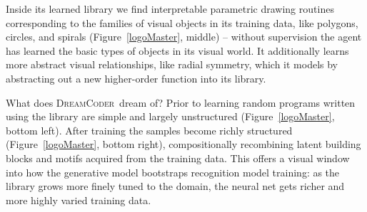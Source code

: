 \documentclass{article}
\newcommand{\system}{\textsc{DreamCoder}~}
\begin{document}
Inside its learned library we find interpretable parametric drawing
routines corresponding to the families of visual objects in its
training data, like polygons, circles, and spirals
(Figure~\ref{logoMaster}, middle) -- without supervision the agent
has learned the basic types of objects in its visual world. It
additionally learns more abstract visual relationships, like
radial symmetry, which it models by abstracting out a new higher-order
function into its library.

What does \system dream of?  Prior to learning random programs written using the library
are simple and largely unstructured (Figure~\ref{logoMaster}, bottom left).
After training the samples become richly structured
(Figure~\ref{logoMaster}, bottom right), compositionally recombining latent
building blocks and motifs acquired from the training data. This
offers a visual window into how the generative model bootstraps recognition
model training: as the library grows more finely tuned to the domain, the
neural net gets richer and more highly varied training data.
\end{document}
